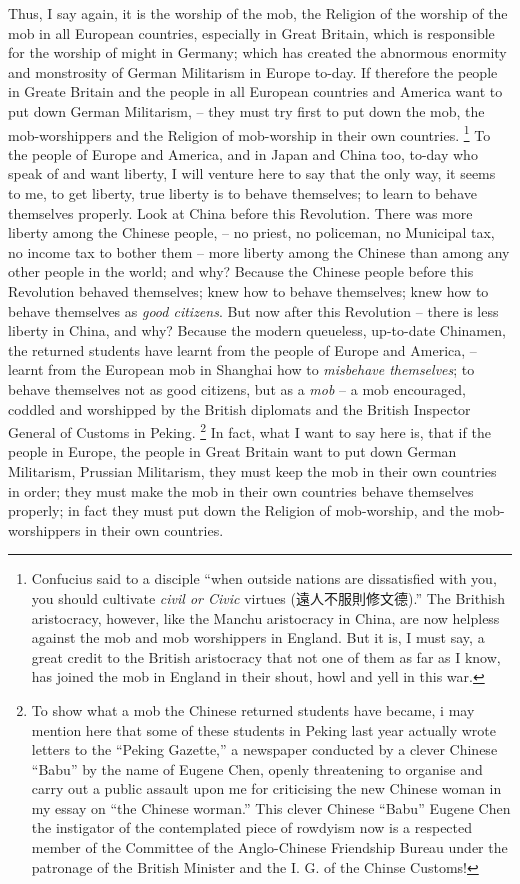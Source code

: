 Thus, I say again, it is the worship of the mob, the Religion of the worship of the mob in all European countries, especially in Great Britain, which is responsible for the worship of might in Germany;
which has created the abnormous enormity and monstrosity of German Militarism in Europe to-day.
If therefore the people in Greate Britain and the people in all European countries and America want to put down German Militarism, -- they must try first to put down the mob, the mob-worshippers and the Religion of mob-worship in their own countries.
\footnote{Confucius said to a disciple ``when outside nations are dissatisfied with you, you should cultivate \emph{civil or Civic} virtues (遠人不服則修文德).''
The Brithish aristocracy, however, like the Manchu aristocracy in China, are now helpless against the mob and mob worshippers in England.
But it is, I must say, a great credit to the British aristocracy that not one of them as far as I know, has joined the mob in England in their shout, howl and yell in this war.}
To the people of Europe and America, and in Japan and China too, to-day who speak of and want liberty, I will venture here to say that the only way, it seems to me, to get liberty, true liberty is to behave themselves;
to learn to behave themselves properly.
Look at China before this Revolution.
There was more liberty among the Chinese people,
-- no priest, no policeman, no Municipal tax,
no income tax to bother them -- more liberty among the Chinese than among any other people in the world;
and why? Because the Chinese people before this Revolution behaved themselves;
knew how to behave themselves;
knew how to behave themselves as \emph{good citizens}.
But now after this Revolution -- there is less liberty in China, and why?
Because the modern queueless, up-to-date Chinamen,
the returned students have learnt from the people of Europe and America,
-- learnt from the European mob in Shanghai how to \emph{misbehave themselves};
to behave themselves not as good citizens,
but as a \emph{mob} -- a mob encouraged, coddled and worshipped by the British diplomats and the British Inspector General of Customs in Peking.
\footnote{To show what a mob the Chinese returned students have became, i may mention here that some of these students in Peking last year actually wrote letters to the ``Peking Gazette,'' a newspaper conducted by a clever Chinese ``Babu'' by the name of Eugene Chen, openly threatening to organise and carry out a public assault upon me for criticising the new Chinese woman in my essay on ``the Chinese worman.'' This clever Chinese ``Babu'' Eugene Chen the instigator of the contemplated piece of rowdyism now is a respected member of the Committee of the Anglo-Chinese Friendship Bureau under the patronage of the British Minister and the I. G. of the Chinse Customs!}
In fact, what I want to say here is, that if the people in Europe, the people in Great Britain want to put down German Militarism, Prussian Militarism,
they must keep the mob in their own countries in order;
they must make the mob in their own countries behave themselves properly;
in fact they must put down the Religion of mob-worship,
and the mob-worshippers in their own countries.


